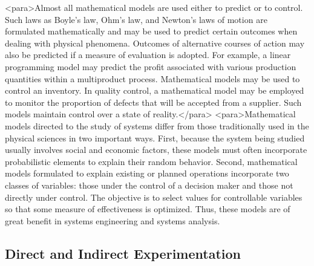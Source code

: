 <para>Almost all mathematical models are used either to predict or to control. Such laws as Boyle’s law, Ohm’s law, and Newton’s laws of motion are formulated mathematically and may be used to predict certain outcomes when dealing with physical phenomena. Outcomes of alternative courses of action may also be predicted if a measure of evaluation is adopted. For example, a linear programming model may predict the profit associated with various production quantities within a multiproduct process. Mathematical models may be used to control an inventory. In quality control, a mathematical model may be employed to monitor the proportion of defects that will be accepted from a supplier. Such models maintain control over a state of reality.</para>
<para>Mathematical models directed to the study of systems differ from those traditionally used in the physical sciences in two important ways. First, because the system being studied usually involves social and economic factors, these models must often incorporate probabilistic elements to explain their random behavior. Second, mathematical models formulated to explain existing or planned operations incorporate two classes of variables: those under the control of a decision maker and those not directly under control. The objective is to select values for controllable variables so that some measure of effectiveness is optimized. Thus, these models are of great benefit in systems engineering and systems analysis.

\subsection{Direct and Indirect Experimentation}

